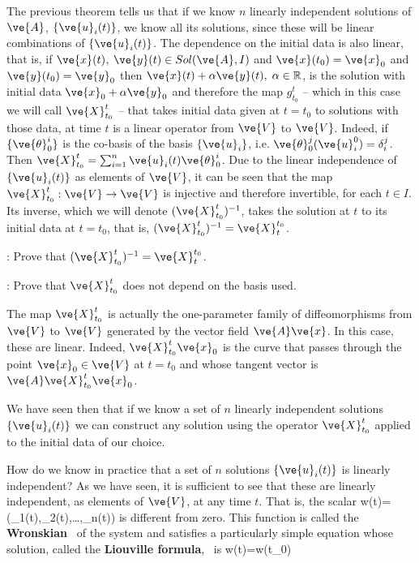 The previous theorem tells us that if we know $n$ linearly independent solutions of $\ve{A}$, $\{\ve{u}_i(t)\}$, we know all its solutions, since these will be linear combinations of $\{\ve{u}_i(t)\}$. The dependence on the initial data is also linear, that is, if $\ve{x}(t)$, $\ve{y}(t) \in Sol(\ve{A},I)$ and $\ve{x}(t_0)=\ve{x}_0$ and $\ve{y}(t_0)=\ve{y}_0$ then $\ve{x}(t)+\alpha \ve{y}(t), \; \alpha \in \mathbb{R}$, is the solution with initial data $\ve{x}_0+\alpha \ve{y}_0$ and therefore the map $g^t_{t_0}$ -- which in this case we will call $\ve{X}_{t_0}^t$ -- that takes initial data given at $t=t_0$ to solutions with those data, at time $t$ is a linear operator from $\ve{V}$ to $\ve{V}$. 
Indeed, if $\{\ve{\theta}_0^i\}$ is the co-basis of the basis $\{\ve{u}_i\}$, i.e. $\ve{\theta}_0^j(\ve{u}_i^0)=\delta^j_i$. 
Then $\ve{X}_{t_0}^t = \sum_{i=1}^n \ve{u}_i(t) \ve{\theta}^i_0$. 
Due to the linear independence of $\{\ve{u}_i(t)\}$ as elements of $\ve{V}$, it can be seen that the map $\ve{X}_{t_0}^t: \ve{V} \to \ve{V}$ is injective and therefore invertible, for each $t \in I$. Its inverse, which we will denote $(\ve{X}_{t_0}^t)^{-1}$, takes the solution at $t$ to its initial data at $t=t_0$, that is, $(\ve{X}_{t_0}^t)^{-1}=\ve{X}_t^{t_0}$.

\espa
\ejer:
Prove that $(\ve{X}_{t_0}^t)^{-1}=\ve{X}_t^{t_0}$.

\ejer:
Prove that $\ve{X}_{t_0}^t$ does not depend on the basis used.
\espa

The map $\ve{X}_{t_0}^t$ is actually the one-parameter family of diffeomorphisms from $\ve{V}$ to $\ve{V}$ generated by the vector field $\ve{A}\ve{x}$. 
In this case, these are linear. 
Indeed, $\ve{X}_{t_0}^t \ve{x}_0$ is the curve that passes through the point $\ve{x}_0 \in \ve{V}$ at $t=t_0$ and whose tangent vector is $\ve{A} \ve{X}_{t_0}^t \ve{x}_0$.

We have seen then that if we know a set of $n$ linearly independent solutions $\{\ve{u}_i(t)\}$ we can construct any solution using the operator $\ve{X}_{t_0}^t$ applied to the initial data of our choice.

How do we know in practice that a set of $n$ solutions $\{\ve{u}_i(t)\}$ is linearly independent? As we have seen, it is sufficient to see that these are linearly independent, as elements of $\ve{V}$, at any time $t$. That is, the scalar
\beq
w(t)=\varepsilon(_1(t),_2(t),\ldots,_n(t))
\eeq
\noi is different from zero. This function is called the {\bf Wronskian}~ of the system and satisfies a particularly simple equation whose solution, called the {\bf Liouville formula},~ is 
\beq
w(t)=w(t_0) \exp {}
\label{5.2}
\eeq
\espa

